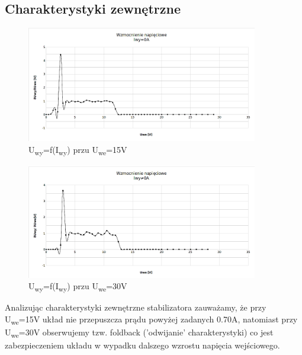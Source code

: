 \documentclass[a4paper,12pt]{article}
\begin{document}
\subsection{Charakterystyki zewnętrzne}

\begin{figure}[h]
  \center
  \includegraphics[width=0.9\textwidth]{charak-zew1}
  \caption{U\textsubscript{wy}=f(I\textsubscript{wy}) przu U\textsubscript{we}=15V}
\end{figure}

\begin{figure}[h]
  \center
  \includegraphics[width=0.9\textwidth]{charak-zew2}
  \caption{U\textsubscript{wy}=f(I\textsubscript{wy}) przu U\textsubscript{we}=30V}
\end{figure}

Analizując charakterystyki zewnętrzne stabilizatora zauważamy, że przy U\textsubscript{we}=15V układ nie przepuszcza prądu powyżej zadanych 0.70A,
natomiast przy U\textsubscript{we}=30V obserwujemy tzw. foldback ('odwijanie' charakterystyki) co jest zabezpieczeniem układu w wypadku dalszego
wzrostu napięcia wejściowego.

\pagebreak
\end{document}

